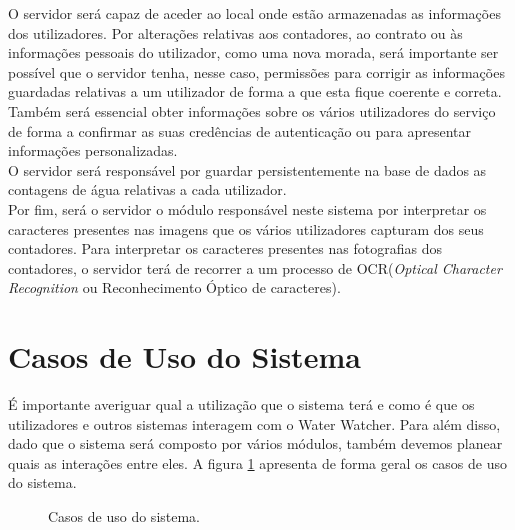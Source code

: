 O servidor será capaz de aceder ao local onde estão armazenadas as informações dos utilizadores.
Por alterações relativas aos contadores, ao contrato ou às informações pessoais do utilizador, como uma nova morada, será importante ser possível que o servidor tenha, nesse caso, permissões para corrigir as informações guardadas relativas a um utilizador de forma a que esta fique coerente e correta. Também será essencial obter informações sobre os vários utilizadores do serviço de forma a confirmar as suas credências de autenticação ou para apresentar informações personalizadas.\\
O servidor será responsável por guardar persistentemente na base de dados as contagens de água relativas a cada utilizador.\\
Por fim, será o servidor o módulo responsável neste sistema por interpretar os caracteres presentes nas imagens que os vários utilizadores capturam dos seus contadores. Para interpretar os caracteres presentes nas fotografias dos contadores, o servidor terá de recorrer a um processo de OCR({\it{Optical Character Recognition}} ou Reconhecimento Óptico de caracteres).

\section{Casos de Uso do Sistema} \label{sec:casos_uso}
É importante averiguar qual a utilização que o sistema terá e como é que os utilizadores e outros sistemas interagem com o Water Watcher. Para além disso, dado que o sistema será composto por vários módulos, também devemos planear quais as interações entre eles. A figura \ref{fig:uso_sistema} apresenta de forma geral os casos de uso do sistema.

\begin{figure}[h!]
\begin{center}
\caption{Casos de uso do sistema.}
\label{fig:uso_sistema}
\end{center}
\end{figure}

